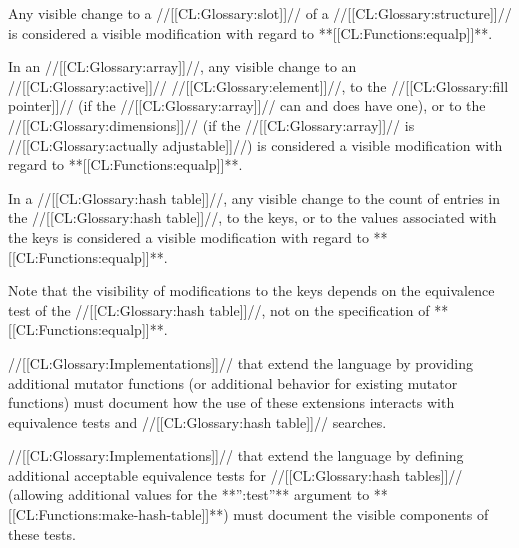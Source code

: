 Any visible change to a //[[CL:Glossary:slot]]// of a //[[CL:Glossary:structure]]//
is considered a visible modification with regard to **[[CL:Functions:equalp]]**.
 
\endsubsubsubsection%
 

In an //[[CL:Glossary:array]]//, any visible change
     to an //[[CL:Glossary:active]]// //[[CL:Glossary:element]]//,
     to the //[[CL:Glossary:fill pointer]]// (if the //[[CL:Glossary:array]]// can and does have one),
  or to the //[[CL:Glossary:dimensions]]// (if the //[[CL:Glossary:array]]// is //[[CL:Glossary:actually adjustable]]//)
is considered a visible modification with regard to **[[CL:Functions:equalp]]**.

\endsubsubsubsection%

 
In a //[[CL:Glossary:hash table]]//, any visible change
     to the count of entries in the //[[CL:Glossary:hash table]]//,
     to the keys,
  or to the values associated with the keys
is considered a visible modification with regard to **[[CL:Functions:equalp]]**.

Note that the visibility of modifications to the keys depends on the equivalence test
of the //[[CL:Glossary:hash table]]//, not on the specification of **[[CL:Functions:equalp]]**.
 
\endsubsubsubsection%

\endsubsubsection%


//[[CL:Glossary:Implementations]]// that extend the language by providing additional mutator
functions (or additional behavior for existing mutator functions) must
document how the use of these extensions interacts with equivalence tests and
//[[CL:Glossary:hash table]]// searches.
 
//[[CL:Glossary:Implementations]]// that extend the language by defining additional acceptable
equivalence tests for //[[CL:Glossary:hash tables]]// (allowing additional values for the **'':test''**
argument to **[[CL:Functions:make-hash-table]]**) must document the visible components of these
tests.

